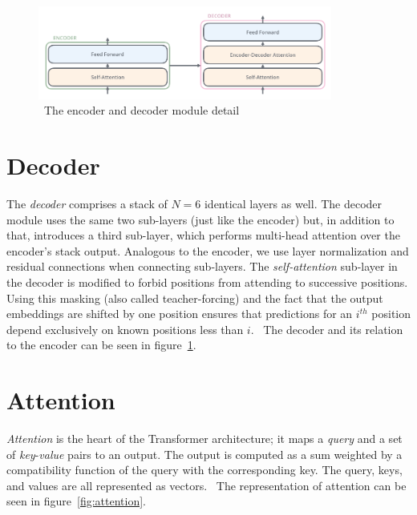 \begin{figure}
    \centering
    \includegraphics[width=0.86\textwidth]{assets/encoder-decoder-detail}
    \caption{~The encoder and decoder module detail~\cite{illustrated-transformer}}\label{fig:encoder-decoder-detail}
\end{figure}


\section{Decoder}\label{sec:decoder}


The \textit{decoder} comprises a stack of $N = 6$ identical layers as well.
The decoder module uses the same two sub-layers (just like the encoder) but, in addition to that, introduces a third sub-layer, which performs multi-head attention over the encoder's stack output.
Analogous to the encoder, we use layer normalization and residual connections when connecting sub-layers.
The \textit{self-attention} sub-layer in the decoder is modified to forbid positions from attending to successive positions.
Using this masking (also called teacher-forcing) and the fact that the output embeddings are shifted by one position ensures that predictions for an $i^{th}$ position depend exclusively on known positions less than $i$.~\cite{attention-is-all-you-need}
The decoder and its relation to the encoder can be seen in figure~\ref{fig:encoder-decoder-detail}.


\section{Attention}\label{sec:attention}

\textit{Attention} is the heart of the Transformer architecture;
it maps a \textit{query} and a set of \textit{key}-\textit{value} pairs to an output.
The output is computed as a sum weighted by a compatibility function of the query with the corresponding key.
The query, keys, and values are all represented as vectors.~\cite{attention-is-all-you-need}
The representation of attention can be seen in figure~\ref{fig:attention}.


